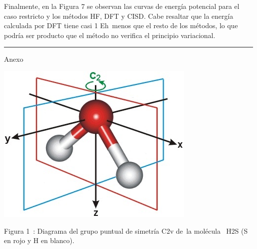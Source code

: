 \documentclass[]{article}
\begin{document}
{Finalmente, en la Figura 7 se observan las curvas de energía potencial
para el caso restricto y los métodos HF, DFT y CISD. Cabe resaltar que
la energía calculada por DFT tiene casi 1 E}{h}{~menos que el resto de
los métodos, lo que podría ser producto que el método no verifica el
principio variacional.}{~}

\begin{center}\rule{0.5\linewidth}{\linethickness}\end{center}

{}

{Anexo}

{\includegraphics{images/image2.jpg}}

{Figura 1}{~: }{Diagrama del grupo puntual de simetría C}{2v }{de}{~la
molécula ~H}{2}{S (S en rojo y H en blanco).}

{}

\protect\hypertarget{t.b57a46846ece3c15b5863e4cf88b4c3f687eaec1}{}{}\protect\hypertarget{t.0}{}{}
\end{document}
